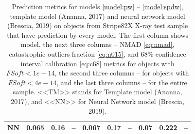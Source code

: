 \documentclass[fleqn,usenatbib]{mnras}
\begin{document}
\begin{table}
\begin{tabular}{llllllllll}
            NN             &                             0.065 &            0.16 &           -- &                             0.067 &            0.17 &           -- &                             0.07 &           0.222 &          -- \\
            \hline
            \end{tabular}
            \caption{Prediction metrics for models \ref{model:pw} -- \ref{model:spdw}, template model (Ananna, 2017) and neural network model (Brescia, 2019) on objects from Stripe82X X-ray test sample that have prediction by every model. The first column shows model, the next three columns -- NMAD \eqref{eq:nmad}, catastrophic outliers fraction \eqref{eq:n015}, and 68\% confidence interval calibration \eqref{eq:c68} metrics for objects with $FSoft < 1e-14$, the second three columns -- for objects with $FSoft < 4e-14$, and the last three columns -- for the entire sample. <<TM>> stands for Template model (Ananna, 2017), and <<NN>> for Neural Network model (Brescia, 2019).}
            \label{tab:stripe82x-intersection}
\end{table}
\end{document}
